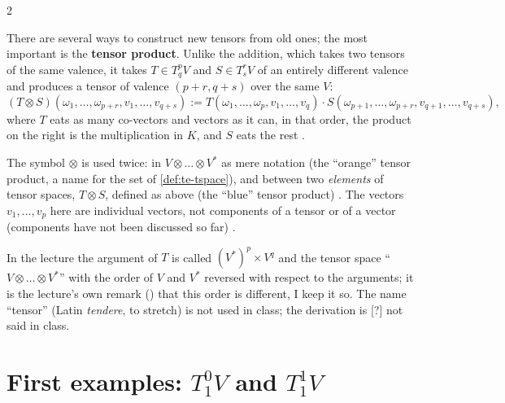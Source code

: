 \begin{paracol}{2}
\begin{definition}\label{def:te-tensorprod}
There are several ways to construct new tensors from old ones; the most important is the \textbf{tensor product}. Unlike the addition, which takes two tensors of the same valence, it takes $T\in T^p_qV$ and $S\in T^r_sV$ of an entirely different valence and produces a tensor of valence $(p+r,q+s)$ over the same $V$:
\[
  (T\otimes S)(\omega_1,\dots,\omega_{p+r},v_1,\dots,v_{q+s}):=T(\omega_1,\dots,\omega_p,v_1,\dots,v_q)\cdot S(\omega_{p+1},\dots,\omega_{p+r},v_{q+1},\dots,v_{q+s}),
\]
where $T$ eats as many co-vectors and vectors as it can, in that order, the product on the right is the multiplication in $K$, and $S$ eats the rest
.
\end{definition}
\begin{remark}\label{rem:te-two-otimes}
The symbol $\otimes$ is used twice: in $V\otimes\dots\otimes V^*$ as mere notation (the ``orange'' tensor product, a name for the set of \cref{def:te-tspace}), and between two \emph{elements} of tensor spaces, $T\otimes S$, defined as above (the ``blue'' tensor product)
. The vectors $v_1,\dots,v_p$ here are individual vectors, not components of a tensor or of a vector (components have not been discussed so far) .
\end{remark}
\begin{coursenote}
In the lecture the argument of $T$ is called $(V^*)^p\times V^q$ and the tensor space ``$V\otimes\dots\otimes V^*$'' with the order of $V$ and $V^*$ reversed with respect to the arguments; it is the lecture's own remark () that this order is different, I keep it so. The name ``tensor''
(Latin \emph{tendere}, to stretch) is not used in class; the derivation is [?] not said in class.
\end{coursenote}

\section{First examples: $T^0_1V$ and $T^1_1V$}\label{sec:te-examples}


\end{paracol}

